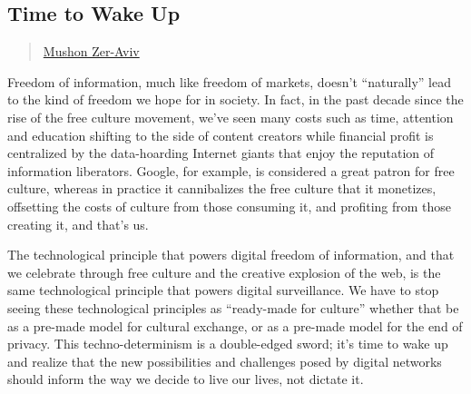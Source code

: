 \subsection{Time to Wake Up}\label{time-to-wake-up}

\begin{quote}
\href{../appendix/attributions.html\#mushon-zer-aviv}{Mushon Zer-Aviv}
\end{quote}

Freedom of information, much like freedom of markets, doesn't
``naturally'' lead to the kind of freedom we hope for in society. In
fact, in the past decade since the rise of the free culture movement,
we've seen many costs such as time, attention and education shifting to
the side of content creators while financial profit is centralized by
the data-hoarding Internet giants that enjoy the reputation of
information liberators. Google, for example, is considered a great
patron for free culture, whereas in practice it cannibalizes the free
culture that it monetizes, offsetting the costs of culture from those
consuming it, and profiting from those creating it, and that's us.

The technological principle that powers digital freedom of information,
and that we celebrate through free culture and the creative explosion of
the web, is the same technological principle that powers digital
surveillance. We have to stop seeing these technological principles as
``ready-made for culture'' whether that be as a pre-made model for
cultural exchange, or as a pre-made model for the end of privacy. This
techno-determinism is a double-edged sword; it's time to wake up and
realize that the new possibilities and challenges posed by digital
networks should inform the way we decide to live our lives, not dictate
it.
